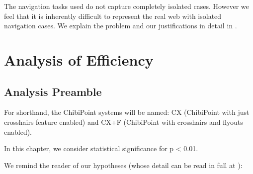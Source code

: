\documentclass[11pt,openright,a4paper]{report}
\begin{document}
The navigation tasks used do not capture completely isolated cases. However we feel that it is inherently difficult to represent the real web with isolated navigation cases. We explain the problem and our justifications in detail in .

\section{Analysis of Efficiency}
\subsection{Analysis Preamble}
For shorthand, the ChibiPoint systems will be named: CX (ChibiPoint with just crosshairs feature enabled) and CX+F (ChibiPoint with crosshairs and flyouts enabled).

In this chapter, we consider statistical significance for p < 0.01.

We remind the reader of our hypotheses (whose detail can be read in full at ):

\textbf{\hypone}\\
\textbf{\hyptwo}\\
\clearpage
\end{document}
